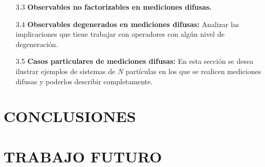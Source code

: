 \documentclass[12pt,oneside]{book}\raggedbottom{} %
\begin{document}
\begin{sloppypar}
{{\begin{itemize}
Se calcula el valor esperado de realizar la medición del nuevo observable.

\begin{itemize}
  \item[3.2.1] \textbf{Medidas POVM en sistemas de varias partículas}
  Se generaliza los operadores de Kraus que se propusieron en un sistema de dos partículas utilizando la descomposición de los efectos de las medidas POVM, que se expusieron anteriormente.
  \item[3.2.2] \textbf{Instrumentos cuánticos en sistemas de $N$ partículas.} 
  Se plantea la primera alternativa de instrumento cuántico utilizando la nueva operación difusa y el nuevo observable, a su vez se calcula el valor esperado. 
  
  De igual forma, se plantea la segunda alternativa y su valor esperado. 
  
  Finalmente se demuestra la proposición que explica en que condiciones los instrumentos para un sistema de $N$ partículas son equivalentes.

\end{itemize} 


\item[3.3] \textbf{Observables no factorizables en mediciones difusas.}

\item[3.4] \textbf{Observables degenerados en mediciones difusas:}
Analizar las implicaciones que tiene trabajar con operadores con algún nivel de degeneración.

\item[3.5] \textbf{Casos particulares de mediciones difusas:}
En esta sección se desea ilustrar ejemplos de sistemas de $N$ partículas en los que se realicen mediciones difusas y poderlos describir completamente.

\end{itemize}
\section*{CONCLUSIONES }
\section*{TRABAJO FUTURO}

\nocite{Hall2013}
\nocite{sakurai2017modern}
\nocite{wilde2011classical}
\nocite{2007geometry}
}

\newpage
\nocite{gomez2010introduccion}



}
\end{sloppypar}
\end{document}
